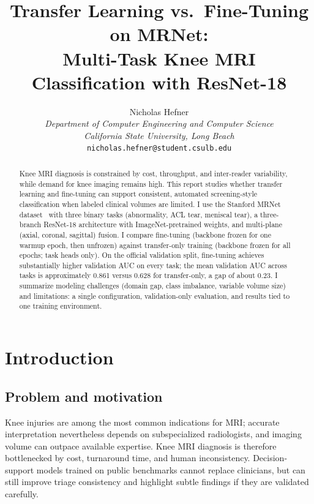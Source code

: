 \documentclass[10pt,twocolumn]{article}
\title{\Large Transfer Learning vs.\ Fine-Tuning on MRNet: \\
Multi-Task Knee MRI Classification with ResNet-18}
\author{
Nicholas Hefner \\
\textit{Department of Computer Engineering and Computer Science} \\
\textit{California State University, Long Beach} \\
\texttt{nicholas.hefner@student.csulb.edu}
}
\date{}
\begin{document}
\maketitle

\begin{abstract}
Knee MRI diagnosis is constrained by cost, throughput, and inter-reader variability, while demand for knee imaging remains high. This report studies whether transfer learning and fine-tuning can support consistent, automated screening-style classification when labeled clinical volumes are limited. I use the Stanford MRNet dataset~\cite{bien2018plos,bien2020deep,stanford_mrnet} with three binary tasks (abnormality, ACL tear, meniscal tear), a three-branch ResNet-18 architecture with ImageNet-pretrained weights, and multi-plane (axial, coronal, sagittal) fusion. I compare fine-tuning (backbone frozen for one warmup epoch, then unfrozen) against transfer-only training (backbone frozen for all epochs; task heads only). On the official validation split, fine-tuning achieves substantially higher validation AUC on every task; the mean validation AUC across tasks is approximately 0.861 versus 0.628 for transfer-only, a gap of about 0.23. I summarize modeling challenges (domain gap, class imbalance, variable volume size) and limitations: a single configuration, validation-only evaluation, and results tied to one training environment.
\end{abstract}

\section{Introduction}
\label{sec:introduction}

\subsection{Problem and motivation}

Knee injuries are among the most common indications for MRI; accurate interpretation nevertheless depends on subspecialized radiologists, and imaging volume can outpace available expertise. Knee MRI diagnosis is therefore bottlenecked by cost, turnaround time, and human inconsistency. Decision-support models trained on public benchmarks cannot replace clinicians, but can still improve triage consistency and highlight subtle findings if they are validated carefully.
\end{document}
